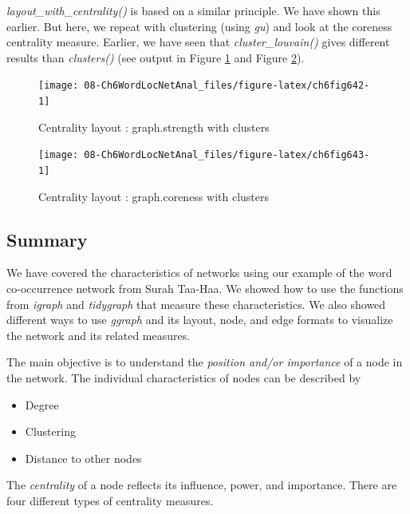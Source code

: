 \documentclass[
]{article}
\providecommand{\tightlist}{%
  \setlength{\itemsep}{0pt}\setlength{\parskip}{0pt}}
\begin{document}
\emph{layout\_with\_centrality()} is based on a similar principle. We have shown this earlier. But here, we repeat with clustering (using \emph{gu}) and look at the coreness centrality measure. Earlier, we have seen that \emph{cluster\_louvain()} gives different results than \emph{clusters()} (see output in Figure \ref{fig:ch6fig642} and Figure \ref{fig:ch6fig643}).

\begin{figure}

{\centering \texttt{[image: 08-Ch6WordLocNetAnal\_files/figure-latex/ch6fig642-1]} 

}

\caption{Centrality layout : graph.strength with clusters}\label{fig:ch6fig642}
\end{figure}

\begin{figure}

{\centering \texttt{[image: 08-Ch6WordLocNetAnal\_files/figure-latex/ch6fig643-1]} 

}

\caption{Centrality layout : graph.coreness with clusters}\label{fig:ch6fig643}
\end{figure}

\hypertarget{chapter-6-summary}{%
\subsection{Summary}\label{chapter-6-summary}}

We have covered the characteristics of networks using our example of the word co-occurrence network from Surah Taa-Haa. We showed how to use the functions from \emph{igraph} and \emph{tidygraph} that measure these characteristics. We also showed different ways to use \emph{ggraph} and its layout, node, and edge formats to visualize the network and its related measures.

The main objective is to understand the \emph{position and/or importance} of a node in the network. The individual characteristics of nodes can be described by

\begin{itemize}
\tightlist
\item
  Degree
\item
  Clustering
\item
  Distance to other nodes
\end{itemize}

The \emph{centrality} of a node reflects its influence, power, and importance. There are four different types of centrality measures.
\end{document}

